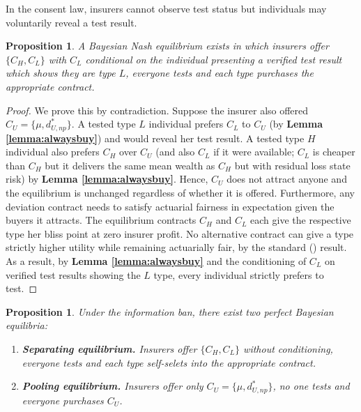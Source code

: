 \documentclass[natbib=false,preprint,12pt]{elsarticle}
\theoremstyle{plain}
\newtheorem{prop}[theorem]{Proposition}
\theoremstyle{definition}
\theoremstyle{plain}
\theoremstyle{TheoremNum}
\theoremstyle{CorollaryNum}
\theoremstyle{PropositionNum}
\theoremstyle{TheoremNum}
\begin{document}
In the consent law, insurers cannot observe test status but individuals may voluntarily reveal a test result.

\begin{prop}\label{prop:cleqnoprinciple}
     A Bayesian Nash equilibrium exists in which insurers offer $\{C_H, C_L\}$ with $C_L$ conditional on the individual presenting a verified test result which shows they are type $L$, everyone tests and each type purchases the appropriate contract.
\end{prop}

\begin{proof}
    We prove this by contradiction. Suppose the insurer also offered $C_U = \{\mu, d_{U,np}^*\}$. A tested type $L$ individual prefers $C_L$ to $C_U$ (by \textbf{Lemma \ref{lemma:alwaysbuy}}) and would reveal her test result. A tested type $H$ individual also prefers $C_H$ over $C_U$ (and also $C_L$ if it were available; $C_L$ is cheaper than $C_H$ but it delivers the same mean wealth as $C_H$ but with residual loss state risk) by \textbf{Lemma \ref{lemma:alwaysbuy}}. Hence, $C_U$ does not attract anyone and the equilibrium is unchanged regardless of whether it is offered. Furthermore, any deviation contract needs to satisfy actuarial fairness in expectation given the buyers it attracts. The equilibrium contracts $C_H$ and $C_L$ each give the respective type her bliss point at zero insurer profit. No alternative contract can give a type strictly higher utility while remaining actuarially fair, by the standard \citeauthor{mossin1968aspects} (\citeyear{mossin1968aspects}) result. As a result, by \textbf{Lemma \ref{lemma:alwaysbuy}} and the conditioning of $C_L$ on verified test results showing the $L$ type, every individual strictly prefers to test.
\end{proof}

\begin{prop}\label{prop:ibeqnoprinciple}
     Under the information ban, there exist two perfect Bayesian equilibria:
    \begin{enumerate}
        \item \textbf{Separating equilibrium.} Insurers offer $\{C_H, C_L\}$ without conditioning, everyone tests and each type self-selets into the appropriate contract.
        \item \textbf{Pooling equilibrium.} Insurers offer only $C_U = \{\mu, d_{U,np}^*\}$, no one tests and everyone purchases $C_U$.
    \end{enumerate}
\end{prop}
\end{document}
